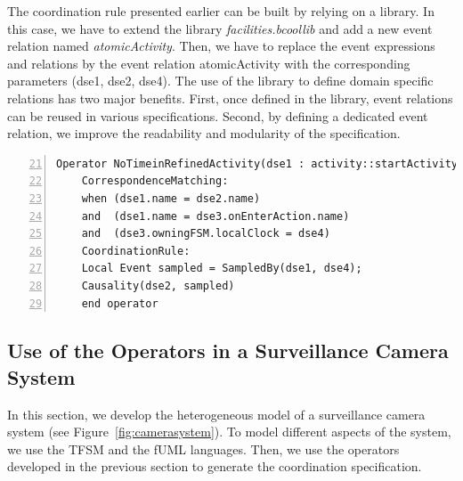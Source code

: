 	The coordination rule presented earlier can be built by relying on a \bcool library. In this case, we have to extend the library \emph{facilities.bcoollib} and add a new event relation named \emph{atomicActivity}. Then, we have to replace the event expressions and relations by the event relation atomicActivity with the corresponding parameters (\ie dse1, dse2, dse4). The use of the library to define domain specific relations has two major benefits. First, once defined in the library, event relations can be reused in various \bcool specifications. Second, by defining a dedicated event relation, we improve the readability and modularity of the \bcool specification.
	
	\begin{lstlisting}[language=bcool,
	caption={Timing coordination operator between TFSM and fUML language},
	label={fig:bcooltimeinactions}, 
	basicstyle=\scriptsize\ttfamily, backgroundcolor=\color{LGrey}, numbers=left,firstnumber=21, xleftmargin=2pt, aboveskip=3pt] 
	Operator NoTimeinRefinedActivity(dse1 : activity::startActivity, dse2 : activity::finishActivity, dse3 : tfsm::entering, dse4 : tfsm::ticks)
	CorrespondenceMatching:
	when (dse1.name = dse2.name)
	and  (dse1.name = dse3.onEnterAction.name)
	and  (dse3.owningFSM.localClock = dse4)
	CoordinationRule:
	Local Event sampled = SampledBy(dse1, dse4);
	Causality(dse2, sampled)
	end operator	 
	\end{lstlisting}
	
	\subsection{Use of the Operators in a Surveillance Camera System}
	In this section, we develop the heterogeneous model of a surveillance camera system (see Figure~\ref{fig:camerasystem}). To model different aspects of the system, we use the TFSM and the fUML languages. Then, we use the operators developed in the previous section to generate the coordination specification. 
	
